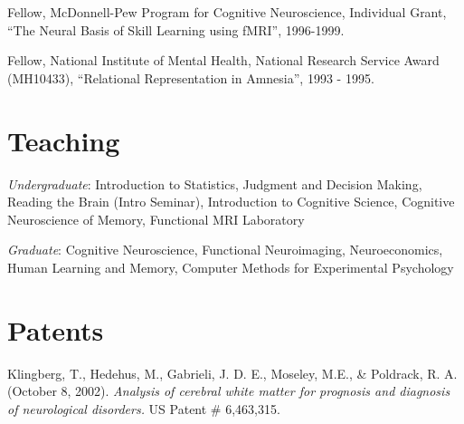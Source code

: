 \documentclass[10pt, letterpaper]{article}
\begin{document}
Fellow, McDonnell-Pew Program for Cognitive Neuroscience, Individual Grant, ``The Neural Basis of Skill Learning using fMRI'', 1996-1999.\vspace{2mm}
      
Fellow, National Institute of Mental Health, National Research Service Award (MH10433), ``Relational Representation in Amnesia'', 1993 - 1995.

\section*{Teaching}

%
%
%
%
%      
%
%      
%
\textit{Undergraduate}: Introduction to Statistics, Judgment and Decision Making, Reading the Brain (Intro Seminar), Introduction to Cognitive Science, Cognitive Neuroscience of Memory, Functional MRI Laboratory\vspace{2mm}

\textit{Graduate}: Cognitive Neuroscience, Functional Neuroimaging, Neuroeconomics, Human Learning and Memory, Computer Methods for Experimental Psychology\vspace{2mm}


\section*{Patents}
Klingberg, T., Hedehus, M., Gabrieli, J. D. E., Moseley, M.E., \& Poldrack, R. A. (October 8, 
2002). \textit{Analysis of cerebral white matter for prognosis and diagnosis of neurological disorders.} US Patent \# 
6,463,315. 
\end{document}
